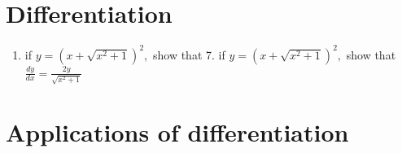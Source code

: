 \documentclass[12pt]{article}
\begin{document}
\section{Differentiation}
\begin{enumerate}
    \item if $y = (x + \sqrt{x^2+1})^2,$ show that 7. if $y = (x + \sqrt{x^2+1})^2,$ show that $\frac{dy}{dx} = \frac{2y}{\sqrt{x^2+1}}$
        

\end{enumerate}

\section{Applications of differentiation}
\end{document}

